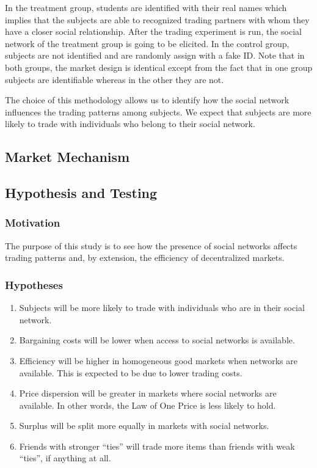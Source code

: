 \documentclass{article}
\begin{document}
In the treatment group, students are identified with their real names which
implies that the subjects are able to recognized trading partners with whom they
have a closer social relationship. After the trading experiment is run, the
social network of the treatment group is going to be elicited. In the control
group, subjects are not identified and are randomly assign with a fake ID. Note
that in both groups, the market design is identical except from the fact that in
one group subjects are identifiable whereas in the other they are not.

The choice of this methodology allows us to identify how the social network
influences the trading patterns among subjects. We expect that subjects are more
likely to trade with individuals who belong to their social network.

\subsection{Market Mechanism}


\subsection{Hypothesis and Testing}
\subsubsection{Motivation}

The purpose of this study is to see how the presence of social networks affects
trading patterns and, by extension, the efficiency of decentralized markets.

\subsubsection{Hypotheses}

\begin{enumerate}[{Hypothesis} 1]
    \item Subjects will be more likely to trade with individuals who are in
        their social network.

    \item Bargaining costs will be lower when access to social networks is
        available.

    \item Efficiency will be higher in homogeneous good markets when networks
        are available. This is expected to be due to lower trading costs.

    \item Price dispersion will be greater in markets where social networks are
        available. In other words, the Law of One Price is less likely to hold.

    \item Surplus will be split more equally in markets with social networks.

    \item Friends with stronger ``ties'' will trade more items than friends with
        weak ``ties'', if anything at all.
\end{enumerate}
\end{document}
